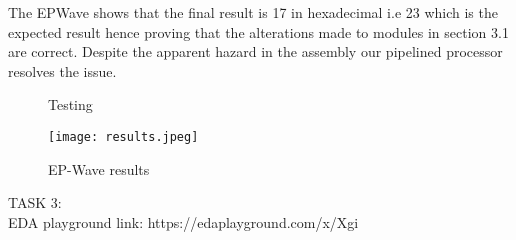 \documentclass{article}
\begin{document}
The EP\textunderscore Wave shows that the final result is 17 in hexadecimal i.e 23 which is the expected result hence proving that the alterations made to modules in section 3.1 are correct. Despite the apparent hazard in the assembly our pipelined processor resolves the issue. 


\begin{figure}
    \centering
    \qquad
    \caption{Testing}
    \label{fig:example}
\end{figure}

\newpage

\begin{center}
    \begin{figure}[!htb]
        \centering
        \texttt{[image: results.jpeg]}
        \caption{EP-Wave results}
        \label{Snapshot of Memory}
    \end{figure}
\end{center}

TASK 3:\\
EDA playground link: https://edaplayground.com/x/Xg\textunderscore i
\end{document}

